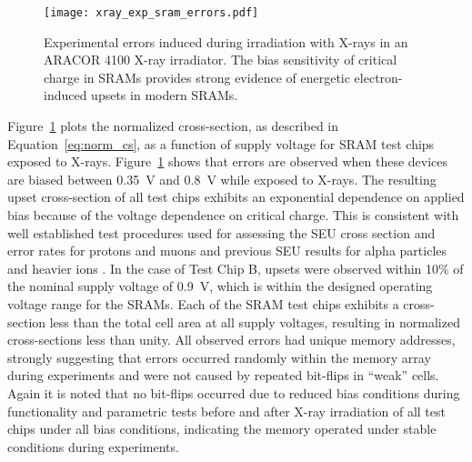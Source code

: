 \begin{figure}[tb]
    \centering
        \texttt{[image: xray\_exp\_sram\_errors.pdf]}
    \caption{Experimental errors induced during irradiation with X-rays in an ARACOR 4100 X-ray irradiator. The bias sensitivity of critical charge in SRAMs provides strong evidence of energetic electron-induced upsets in modern SRAMs.}
    \label{fig:xray_exp_seus}
\end{figure}
Figure~\ref{fig:xray_exp_seus} plots the normalized cross-section, as described in Equation~\ref{eq:norm_cs}, as a function of supply voltage for SRAM test chips exposed to X-rays.
Figure~\ref{fig:xray_exp_seus} shows that errors are observed when these devices are biased between 0.35~V and 0.8~V while exposed to X-rays. 
The resulting upset cross-section of all test chips exhibits an exponential dependence on applied bias because of the voltage dependence on critical charge. 
This is consistent with well established test procedures used for assessing the SEU cross section and error rates for protons and muons \cite{Rodbell:2007vl, Sierawski:2010cj} and previous SEU results for alpha particles and heavier ions \cite{buehler1990alpha,barak1999scaling,barak2004use}. 
In the case of Test Chip B, upsets were observed within 10\% of the nominal supply voltage of 0.9~V, which is within the designed operating voltage range for the SRAMs. 
Each of the SRAM test chips exhibits a cross-section less than the total cell area at all supply voltages, resulting in normalized cross-sections less than unity.
All observed errors had unique memory addresses, strongly suggesting that errors occurred randomly within the memory array during experiments and were not caused by repeated bit-flips in ``weak'' cells.
Again it is noted that no bit-flips occurred due to reduced bias conditions during functionality and parametric tests before and after X-ray irradiation of all test chips under all bias conditions, indicating the memory operated under stable conditions during experiments.

